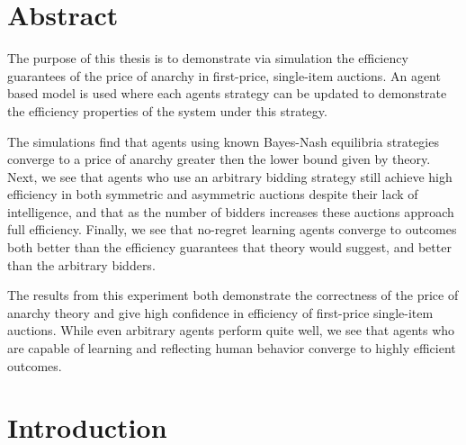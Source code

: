\documentclass[12pt,twoside]{reedthesis}
\begin{document}
    \tableofcontents

    \chapter*{Abstract}
    
    The purpose of this thesis is to demonstrate via simulation the efficiency guarantees of the price of anarchy in first-price, single-item auctions. An agent based model is used where each agents strategy can be updated to demonstrate the efficiency properties of the system under this strategy. 
    
    The simulations find that agents using known Bayes-Nash equilibria strategies converge to a price of anarchy greater then the lower bound given by theory. Next, we see that agents who use an arbitrary bidding strategy still achieve high efficiency in both symmetric and asymmetric auctions despite their lack of intelligence, and that as the number of bidders increases these auctions approach full efficiency. Finally, we see that no-regret learning agents converge to outcomes both better than the efficiency guarantees that theory would suggest, and better than the arbitrary bidders.  
    
    The results from this experiment both demonstrate the correctness of the price of anarchy theory and give high confidence in efficiency of first-price single-item auctions. While even arbitrary agents perform quite well, we see that agents who are capable of learning and reflecting human behavior converge to highly efficient outcomes.  
	

  \mainmatter %
  \pagestyle{fancyplain} %


    \chapter*{Introduction}
\end{document}
